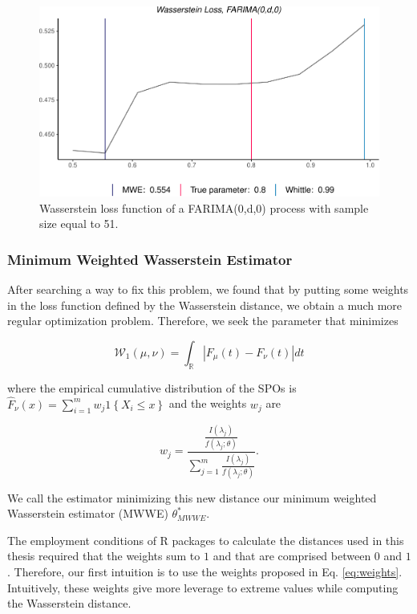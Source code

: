 \documentclass[
  11pt,
]{article}
\begin{document}
\begin{figure}

{\centering \includegraphics[width=0.5\linewidth]{Master_thesis_V2_files/figure-latex/small_sample-1} 

}

\caption{Wasserstein loss function of a FARIMA(0,d,0) process with sample size equal to 51.}\label{fig:small_sample}
\end{figure}

\hypertarget{minimum-weighted-wasserstein-estimator}{%
\subsubsection{Minimum Weighted Wasserstein
Estimator}\label{minimum-weighted-wasserstein-estimator}}

After searching a way to fix this problem, we found that by putting some
weights in the loss function defined by the Wasserstein distance, we
obtain a much more regular optimization problem. Therefore, we seek the
parameter that minimizes

\begin{equation}
\mathcal{W}_{1}(\mu, \nu)=\int_{\mathbb{R}}\left|F_{\mu}(t)-F_{\nu}(t)\right| d t
\end{equation}

where the empirical cumulative distribution of the SPOs is
\(\hat F_\nu(x)=\sum_{i=1}^{m} w_{j} 1\left\{X_{i} \leq x\right\}\) and
the weights \(w_j\) are

\begin{equation}
w_j = \frac{\frac{I(\lambda_j)}{f(\lambda_j; \theta)}}{\sum^m_{j = 1}\frac{I(\lambda_j)}{f(\lambda_j; \theta)}}.
\label{eq:weights}
\end{equation}

We call the estimator minimizing this new distance our minimum weighted
Wasserstein estimator (MWWE) \(\theta^*_{MWWE}\).

The employment conditions of R packages to calculate the distances used
in this thesis required that the weights sum to \(1\) and that are
comprised between \(0\) and \(1\). Therefore, our first intuition is to
use the weights proposed in Eq. \ref{eq:weights}. Intuitively, these
weights give more leverage to extreme values while computing the
Wasserstein distance.
\end{document}
